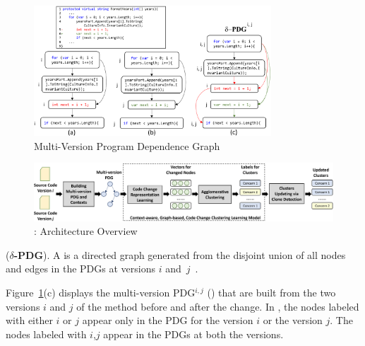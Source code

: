 \begin{figure}[t]
	\centering
	\includegraphics[width=3.5in]{figures/multi-version-graph-3.png} %
	\vspace{-18pt}
	\caption{Multi-Version Program Dependence Graph}
	\label{fig:multi-version-pdg}
\end{figure}

\begin{figure}[t]
	\centering
 	\includegraphics[width=6.8in]{figures/overview-3.png}
	\vspace{-6pt}
	\caption{{\tool}: Architecture Overview}
	\label{fig:overview}
\end{figure}


\begin{Definition} ({\bf $\delta$-PDG}).
A {\mvpdg} is a directed graph generated from the disjoint union of
all nodes and edges in the PDGs at versions $i$
and~$j$~\cite{flexeme-fse20}.
%
\end{Definition}

Figure~\ref{fig:multi-version-pdg}(c) displays the multi-version
PDG$^{i,j}$ ({\mvpdg}) that are built from the two
versions $i$ and $j$ of the method  before and after
the change. In {\mvpdg}, the nodes labeled with either $i$
or $j$ appear only in the PDG for the version $i$ or the version $j$.
The nodes labeled with $i$,$j$ appear in the PDGs at both the
versions.


